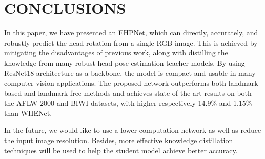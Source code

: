 \documentclass[a4paper,twoside]{article}
\begin{document}
\section{\uppercase{Conclusions}}
\label{sec:conclusion}
In this paper,  we have presented an EHPNet,  which can directly, accurately, and robustly predict the head rotation from a single RGB image.  This is achieved by mitigating the disadvantages of previous work, along with distilling the knowledge from many robust head pose estimation teacher models.  By using ResNet18 architecture as a backbone, the model is compact and usable in many computer vision applications. The proposed network outperforms both landmark-based and landmark-free methods and achieves state-of-the-art results on both the AFLW-2000 and BIWI datasets, with higher respectively 14.9\% and 1.15\% than WHENet. 

In the future, we would like to use a lower computation network as well as reduce the input image resolution. Besides, more effective knowledge distillation techniques will be used to help the student model achieve better accuracy.
\end{document}
